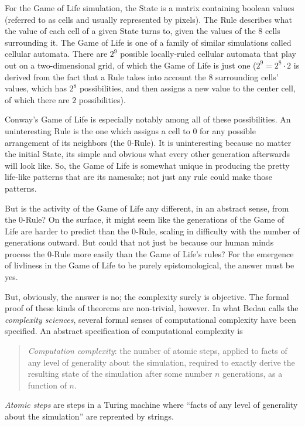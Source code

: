 \documentclass{article}
\newcommand{\ti}[1]{\textit{#1}}
\begin{document}
For the Game of Life simulation, the State is a matrix containing boolean values (referred to as cells and usually represented by pixels). The Rule describes what the value of each cell of a given State turns to, given the values of the 8 cells surrounding it. The Game of Life is one of a family of similar simulations called cellular automata. There are $2^9$ possible locally-ruled cellular automata that play out on a two-dimensional grid, of which the Game of Life is just one ($2^9 = 2^8 \cdot 2$ is derived from the fact that a Rule takes into account the $8$ surrounding cells' values, which has $2^8$ possibilities, and then assigns a new value to the center cell, of which there are $2$ possibilities).

Conway's Game of Life is especially notably among all of these possibilities. An uninteresting Rule is the one which assigns a cell to $0$ for any possible arrangement of its neighbors (the $0$-Rule). It is uninteresting because no matter the initial State, its simple and obvious what every other generation afterwards will look like. So, the Game of Life is somewhat unique in producing the pretty life-like patterns that are its namesake; not just any rule could make those patterns.

But is the activity of the Game of Life any different, in an abstract sense, from the $0$-Rule? On the surface, it might seem like the generations of the Game of Life are harder to predict than the $0$-Rule, scaling in difficulty with the number of generations outward. But could that not just be because our human minds process the $0$-Rule more easily than the Game of Life's rules? For the emergence of livliness in the Game of Life to be purely epistomological, the answer must be yes.

But, obviously, the answer is no; the complexity surely is objective. The formal proof of these kinds of theorems are non-trivial, however. In what Bedau calls the \ti{complexity sciences}, several formal senses of computational complexity have been specified. An abstract specification of computational complexity is

\begin{quote}
\ti{Computation complexity}: the number of atomic steps, applied to facts of any level of generality about the simulation, required to exactly derive the resulting state of the simulation after some number $n$ generations, as a function of $n$.
\end{quote}

\ti{Atomic steps} are steps in a Turing machine where ``facts of any level of generality about the simulation'' are reprented by strings.
\end{document}
